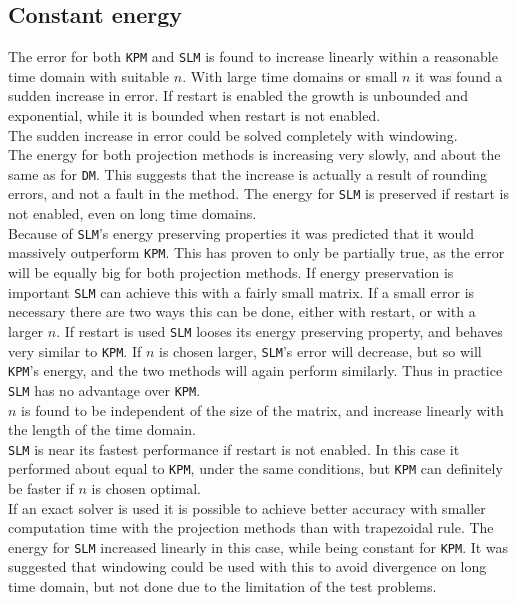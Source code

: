 \subsection{Constant energy} %
The error for both \texttt{KPM} and \texttt{SLM} is found to increase linearly within a reasonable time domain with suitable $n$. With large time domains or small $n$ it was found a sudden increase in error. If restart is enabled the growth is unbounded and exponential, while it is bounded when restart is not enabled.\\
The sudden increase in error could be solved completely with windowing. \\
The energy for both projection methods is increasing very slowly, and about the same as for \texttt{DM}. This suggests that the increase is actually a result of rounding errors, and not a fault in the method. The energy for \texttt{SLM} is preserved if restart is not enabled, even on long time domains. \\

Because of \texttt{SLM}'s energy preserving properties it was predicted that it would massively outperform \texttt{KPM}. This has proven to only be partially true, as the error will be equally big for both projection methods. If energy preservation is important \texttt{SLM} can achieve this with a fairly small matrix. If a small error is necessary there are two ways this can be done, either with restart, or with a larger $n$. If restart is used \texttt{SLM} looses its energy preserving property, and behaves very similar to \texttt{KPM}. If $n$ is chosen larger, \texttt{SLM}'s error will decrease, but so will \texttt{KPM}'s energy, and the two methods will again perform similarly. Thus in practice \texttt{SLM} has no advantage over \texttt{KPM}.\\

$n$ is found to be independent of the size of the matrix, and increase linearly with the length of the time domain.\\

\texttt{SLM} is near its fastest performance if restart is not enabled. In this case it performed about equal to \texttt{KPM}, under the same conditions, but \texttt{KPM} can definitely be faster if $n$ is chosen optimal. \\

If an exact solver is used it is possible to achieve better accuracy with smaller computation time with the projection methods than with trapezoidal rule. The energy for \texttt{SLM} increased linearly in this case, while being constant for \texttt{KPM}. It was suggested that windowing could be used with this to avoid divergence on long time domain, but not done due to the limitation of the test problems. \\

